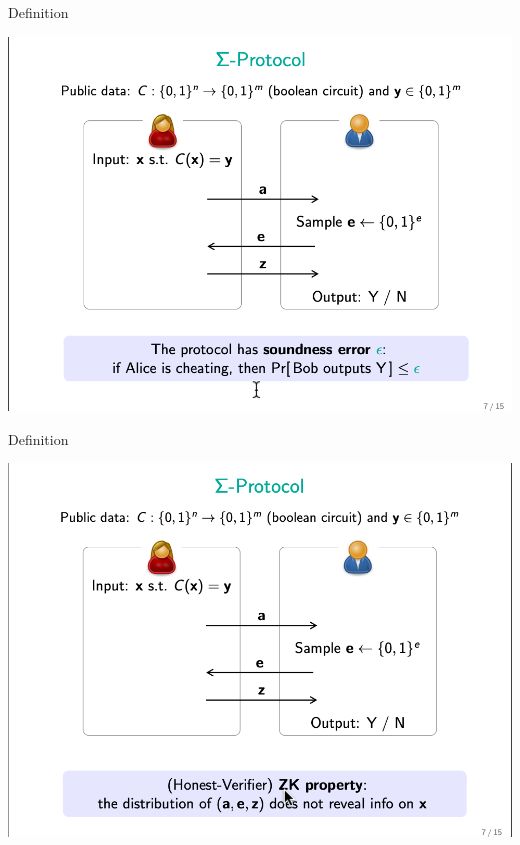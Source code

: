 \documentclass{beamer}
\begin{document}
\begin{frame}{Definition}
	\begin{minipage}{0.42\linewidth}
		\includegraphics[scale=0.4]{f6.png}
	\end{minipage}
\end{frame}


\begin{frame}{Definition}
	\begin{minipage}{0.42\linewidth}
		\includegraphics[scale=0.4]{f7.png}
	\end{minipage}
\end{frame}
\end{document}
